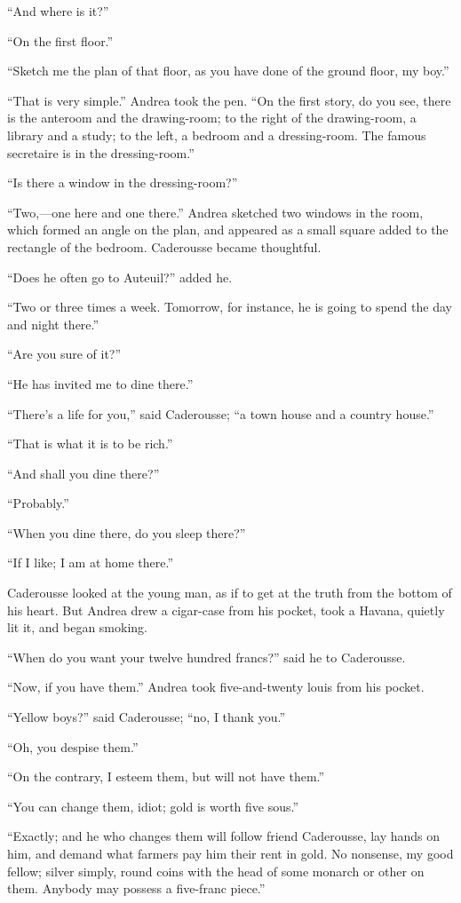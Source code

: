 “And where is it?”

“On the first floor.”

“Sketch me the plan of that floor, as you have done of the ground
floor, my boy.”

“That is very simple.” Andrea took the pen. “On the first story, do you
see, there is the anteroom and the drawing-room; to the right of the
drawing-room, a library and a study; to the left, a bedroom and a
dressing-room. The famous secretaire is in the dressing-room.”

“Is there a window in the dressing-room?”

“Two,—one here and one there.” Andrea sketched two windows in the room,
which formed an angle on the plan, and appeared as a small square added
to the rectangle of the bedroom. Caderousse became thoughtful.

“Does he often go to Auteuil?” added he.

“Two or three times a week. Tomorrow, for instance, he is going to
spend the day and night there.”

“Are you sure of it?”

“He has invited me to dine there.”

“There’s a life for you,” said Caderousse; “a town house and a country
house.”

“That is what it is to be rich.”

“And shall you dine there?”

“Probably.”

“When you dine there, do you sleep there?”

“If I like; I am at home there.”

Caderousse looked at the young man, as if to get at the truth from the
bottom of his heart. But Andrea drew a cigar-case from his pocket, took
a Havana, quietly lit it, and began smoking.

“When do you want your twelve hundred francs?” said he to Caderousse.

“Now, if you have them.” Andrea took five-and-twenty louis from his
pocket.

“Yellow boys?” said Caderousse; “no, I thank you.”

“Oh, you despise them.”

“On the contrary, I esteem them, but will not have them.”

“You can change them, idiot; gold is worth five sous.”

“Exactly; and he who changes them will follow friend Caderousse, lay
hands on him, and demand what farmers pay him their rent in gold. No
nonsense, my good fellow; silver simply, round coins with the head of
some monarch or other on them. Anybody may possess a five-franc piece.”

